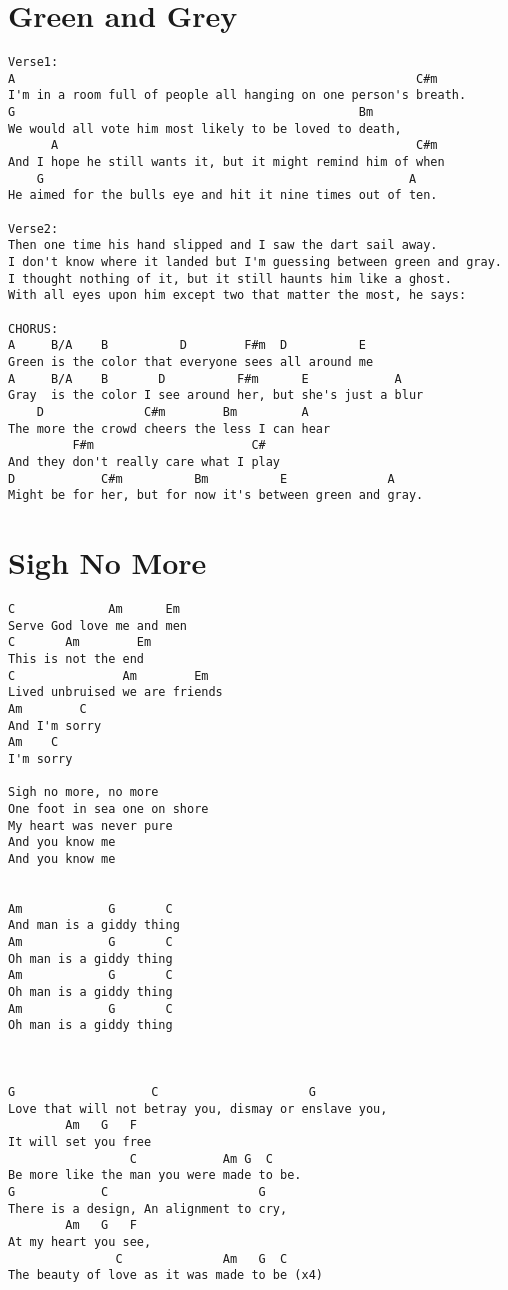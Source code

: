 \documentclass[leqno]{memoir}
\begin{document}
\chapter{Green and Grey}
\begin{verbatim}
Verse1:
A                                                        C#m
I'm in a room full of people all hanging on one person's breath.
G                                                Bm
We would all vote him most likely to be loved to death,
      A                                                  C#m
And I hope he still wants it, but it might remind him of when
    G                                                   A
He aimed for the bulls eye and hit it nine times out of ten.

Verse2:
Then one time his hand slipped and I saw the dart sail away.
I don't know where it landed but I'm guessing between green and gray.
I thought nothing of it, but it still haunts him like a ghost.
With all eyes upon him except two that matter the most, he says:

CHORUS:
A     B/A    B          D        F#m  D          E
Green is the color that everyone sees all around me
A     B/A    B       D          F#m      E            A 
Gray  is the color I see around her, but she's just a blur
    D              C#m        Bm         A         
The more the crowd cheers the less I can hear 
         F#m                      C#
And they don't really care what I play
D            C#m          Bm          E              A
Might be for her, but for now it's between green and gray.

\end{verbatim}
\newpage


\chapter{Sigh No More}
\begin{verbatim}
C             Am      Em
Serve God love me and men
C       Am        Em
This is not the end
C               Am        Em
Lived unbruised we are friends
Am        C
And I'm sorry
Am    C
I'm sorry

Sigh no more, no more
One foot in sea one on shore
My heart was never pure
And you know me
And you know me


Am            G       C
And man is a giddy thing
Am            G       C
Oh man is a giddy thing
Am            G       C
Oh man is a giddy thing
Am            G       C
Oh man is a giddy thing



G                   C                     G
Love that will not betray you, dismay or enslave you,
        Am   G   F
It will set you free
                 C            Am G  C
Be more like the man you were made to be.
G            C                     G
There is a design, An alignment to cry,
        Am   G   F
At my heart you see,
               C              Am   G  C
The beauty of love as it was made to be (x4)

\end{verbatim}
\newpage
\end{document}
